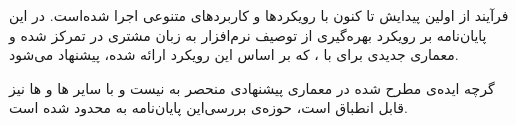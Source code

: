 
فرآیند  از اولین پیدایش تا کنون با رویکرد‌ها و کاربردهای
متنوعی اجرا شده‌است. در این پایان‌نامه بر رویکرد بهره‌گیری از توصیف
نرم‌افزار به زبان مشتری در  تمرکز شده و معماری‌ جدیدی برای
 با  ، که بر اساس این رویکرد
ارائه شده، پیشنهاد می‌شود.

گرچه ایده‌ی مطرح شده در معماری پیشنهادی منحصر به 
 نیست و با سایر ‌ها و ‌ها نیز
قابل انطباق است، حوزه‌ی بررسی‌این پایان‌نامه به 
 محدود شده است.







